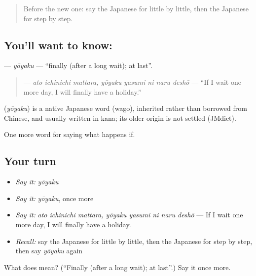 \label{lesson:JA-C521-youyaku}



\begin{quote}
Before the new one: say the Japanese for little by little, then the Japanese for step by step.
\end{quote}

\subsection*{You'll want to know: }
\textbf{} — \emph{yōyaku} — \textquotedblleft{}finally (after a long wait); at last\textquotedblright{}.

\begin{quote}
\textbf{    } — \emph{ato ichinichi mattara, yōyaku yasumi ni naru deshō} — \textquotedblleft{}If I wait one more day, I will finally have a holiday.\textquotedblright{}
\end{quote}

\begin{cousinweb}
\textbf{} (\emph{yōyaku}) is a native Japanese word (wago), inherited rather than borrowed from Chinese, and usually written in kana; its older origin is not settled (JMdict).
\end{cousinweb}

\begin{grammarlens}[title={What you've built}]
One more word for saying what happens if.
\end{grammarlens}

\subsection*{Your turn}
\begin{itemize}
\raggedright
  \item \emph{Say it:} \emph{yōyaku}
  \item \emph{Say it:} \emph{yōyaku}, once more
  \item \emph{Say it:} \emph{ato ichinichi mattara, yōyaku yasumi ni naru deshō} — If I wait one more day, I will finally have a holiday.
  \item \emph{Recall:} say the Japanese for little by little, then the Japanese for step by step, then say \emph{yōyaku} again
\end{itemize}

\begin{tcolorbox}[breakable,colback=teal!4,colframe=teal!35!black,title={Before you move on}]
What does  mean? (\textquotedblleft{}Finally (after a long wait); at last\textquotedblright{}.) Say it once more.
\end{tcolorbox}
